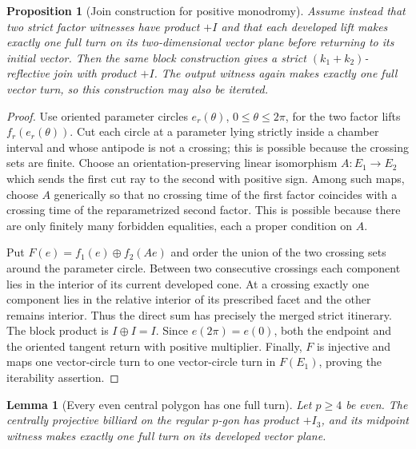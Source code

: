 \documentclass[11pt,a4paper]{article}
\theoremstyle{plain}
\newtheorem{lemma}[theorem]{Lemma}
\newtheorem{proposition}[theorem]{Proposition}
\theoremstyle{definition}
\theoremstyle{remark}
\begin{document}
\begin{proposition}[Join construction for positive monodromy]
\label{prop:join-positive}
Assume instead that two strict factor witnesses have product $+I$ and that each
developed lift makes exactly one full turn on its two-dimensional vector plane
before returning to its initial vector.  Then the same block construction gives a
strict $(k_1+k_2)$-reflective join with product $+I$.  The output witness again
makes exactly one full vector turn, so this construction may also be iterated.
\end{proposition}

\begin{proof}
Use oriented parameter circles $e_r(\theta)$, $0\le\theta\le2\pi$, for the two
factor lifts $f_r(e_r(\theta))$.  Cut each circle at a parameter lying strictly
inside a chamber interval and whose antipode is not a crossing; this is possible
because the crossing sets are finite.  Choose an orientation-preserving linear
isomorphism $A:E_1\to E_2$ which sends the first cut ray to the second with
positive sign.  Among such maps, choose $A$ generically so that no crossing time
of the first factor coincides with a crossing time of the reparametrized second
factor.  This is possible because there are only finitely many forbidden
equalities, each a proper condition on $A$.

Put $F(e)=f_1(e)\oplus f_2(Ae)$ and order the union of the two crossing sets around
the parameter circle.  Between two consecutive crossings each component lies in
the interior of its current developed cone.  At a crossing exactly one component
lies in the relative interior of its prescribed facet and the other remains
interior.  Thus the direct sum has precisely the merged strict itinerary.  The
block product is $I\oplus I=I$.  Since $e(2\pi)=e(0)$, both the endpoint and the
oriented tangent return with positive multiplier.  Finally, $F$ is injective and
maps one vector-circle turn to one vector-circle turn in $F(E_1)$, proving the
iterability assertion.
\end{proof}

\begin{lemma}[Every even central polygon has one full turn]
\label{lem:even-cyclic-full-turn}
Let $p\ge4$ be even. The centrally projective billiard on the regular $p$-gon
has product $+I_3$, and its midpoint witness makes exactly one full turn on its
developed vector plane.
\end{lemma}
\end{document}
